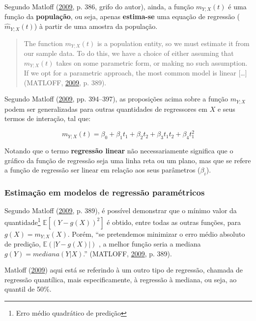 \documentclass[a4paper, 12pt]{article}
\let\rmarkdownfootnote\footnote%
\def\footnote{\protect\rmarkdownfootnote}
\begin{document}
Segundo Matloff (\protect\hyperlink{ref-matloff2009}{2009}, p. 386,
grifo do autor), ainda, a função \(m_{Y;X}(t)\) é uma função da
\textbf{população}, ou seja, apenas \textbf{estima-se} uma equação de
regressão (\(\hat{m}_{Y;X}(t)\)) à partir de uma amostra da população.

\begin{quote}
The function \(m_{Y;X}(t)\) is a population entity, so we must estimate
it from our sample data. To do this, we have a choice of either assuming
that \(m_{Y;X}(t)\) takes on some parametric form, or making no such
assumption. If we opt for a parametric approach, the most common model
is linear {[}\ldots{}{]} (MATLOFF,
\protect\hyperlink{ref-matloff2009}{2009}, p. 389).
\end{quote}

Segundo Matloff (\protect\hyperlink{ref-matloff2009}{2009}, pp.
394--397), as proposições acima sobre a função \(m_{Y;X}\) podem ser
generalizadas para outras quantidades de regressores em \(X\) e seus
termos de interação, tal que:

\[m_{Y;X}(t) = \beta_0 + \beta_1t_1 + \beta_2t_2 + \beta_3t_1t_2 + \beta_4t_1^2\]

Notando que o termo \textbf{regressão linear} não necessariamente
significa que o gráfico da função de regressão seja uma linha reta ou um
plano, mas que se refere a função de regressão ser linear em relação aos
seus parâmetros (\(\beta_i\)).

\subsubsection{Estimação em modelos de regressão
paramétricos}\label{estimacao-em-modelos-de-regressao-parametricos}

Segundo Matloff (\protect\hyperlink{ref-matloff2009}{2009}, p. 389), é
possível demonstrar que o mínimo valor da quantidade\footnote{Erro médio
  quadrático de predição} \(\mathbb{E}[(Y - g(X))^2]\) é obtido, entre
todas as outras funções, para \(g(X) = m_{Y;X}(X)\). Porém, ``se
pretendemos minimizar o erro médio absoluto de predição,
\(\mathbb{E}(|Y - g(X)|)\) , a melhor função seria a mediana
\(g(Y) = mediana(Y|X)\).'' (MATLOFF,
\protect\hyperlink{ref-matloff2009}{2009}, p. 389).

Matloff (\protect\hyperlink{ref-matloff2009}{2009}) aqui está se
referindo à um outro tipo de regressão, chamada de regressão quantílica,
mais especificamente, à regressão à mediana, ou seja, ao quantil de
50\%.
\end{document}
